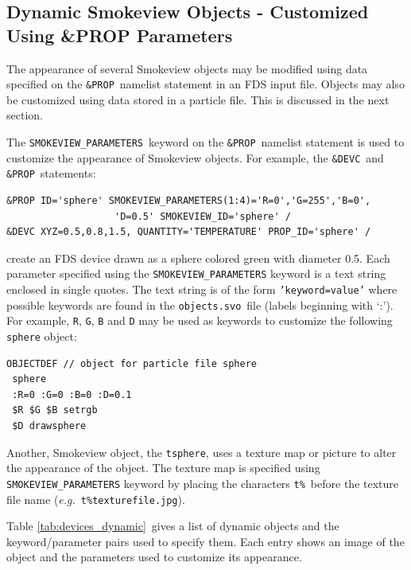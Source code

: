 %
\subsection{Dynamic Smokeview Objects - Customized Using \&PROP Parameters}
The appearance of several Smokeview objects may be modified using data specified on the {\tt \&PROP}\ namelist statement in an FDS input
file.  Objects may also be customized using data stored in a particle file.  This is discussed in the next section.

The {\tt SMOKEVIEW\_PARAMETERS}\ keyword on the {\tt \&PROP}\
namelist statement is used to customize the appearance of Smokeview objects.  For example, the {\tt \&DEVC}\ and {\tt \&PROP}\ statements:
\begin{verbatim}
&PROP ID='sphere' SMOKEVIEW_PARAMETERS(1:4)='R=0','G=255','B=0',
                   'D=0.5' SMOKEVIEW_ID='sphere' /
&DEVC XYZ=0.5,0.8,1.5, QUANTITY='TEMPERATURE' PROP_ID='sphere' /
\end{verbatim}
create an FDS device drawn as a sphere colored green with diameter 0.5. Each parameter specified using the
{\tt SMOKEVIEW\_PARAMETERS} keyword
is a text string enclosed in single quotes.  The text string is of the form {\tt 'keyword=value'} where possible
keywords are found in the {\tt objects.svo}\ file (labels beginning with `:').  For example, {\tt R}, {\tt G},
{\tt B} and {\tt D} may be used as keywords to customize the following {\tt sphere} object:
\begin{verbatim}
OBJECTDEF // object for particle file sphere
 sphere
 :R=0 :G=0 :B=0 :D=0.1
 $R $G $B setrgb
 $D drawsphere
\end{verbatim}

Another, Smokeview object, the {\tt tsphere}, uses a texture map or picture to alter the appearance of the object.
The texture map is specified using {\tt SMOKEVIEW\_PARAMETERS} keyword by placing the characters {\tt t\%}\
before the texture file name ({\em e.g.}\ {\tt t\%texturefile.jpg}).

Table \ref{tab:devices_dynamic}\ gives a list of dynamic objects and the keyword/parameter pairs used to specify them.
Each entry shows an image of the object and the parameters used to customize its appearance.

